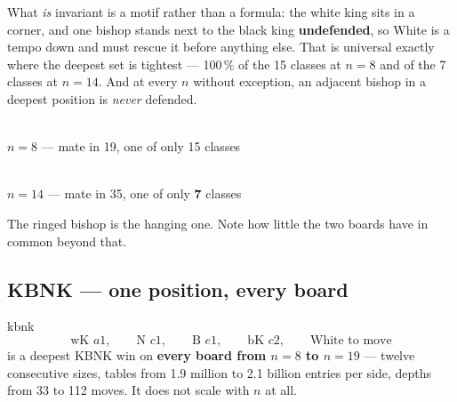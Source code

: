 \documentclass[11pt]{article}
\begin{document}
\noindent
What \emph{is} invariant is a motif rather than a formula: the white king sits
in a corner, and one bishop stands next to the black king \textbf{undefended},
so White is a tempo down and must rescue it before anything else. That is
universal exactly where the deepest set is tightest --- 100\,\% of the 15
classes at $n=8$ and of the 7 classes at $n=14$. And at every $n$ without
exception, an adjacent bishop in a deepest position is \emph{never} defended.

\begin{center}
\begin{minipage}{0.42\textwidth}\centering
  \\[1.5mm]
  {\small $n=8$ --- mate in 19, one of only 15 classes}
\end{minipage}\hfill
\begin{minipage}{0.42\textwidth}\centering
  \\[1.5mm]
  {\small $n=14$ --- mate in 35, one of only \textbf{7} classes}
\end{minipage}
\end{center}
\noindent
{\small The ringed bishop is the hanging one. Note how little the two boards have
in common beyond that.}

\medskip


\subsection{KBNK --- one position, every board}\label{sub:kbnk-family}

\begin{result}[title={A single fixed position, unchanged for all $n$}]{kbnk}
\[ \text{wK }a1,\qquad \text{N }c1,\qquad \text{B }e1,\qquad \text{bK }c2,
   \qquad \text{White to move} \]
is a deepest KBNK win on \textbf{every board from $n=8$ to $n=19$} --- twelve
consecutive sizes, tables from 1.9 million to 2.1 billion entries per side,
depths from 33 to 112 moves. It does not scale with $n$ at all.
\end{result}
\end{document}
